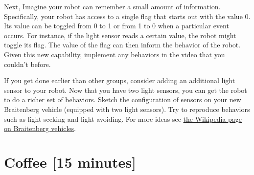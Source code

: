 \documentclass{tufte-handout}
\begin{document}
Next, Imagine your robot can remember a small amount of information.   Specifically, your robot has access to a single flag that starts out with the value 0.  Its value can be toggled from 0 to 1 or from 1 to 0 when a particular event occurs.  For instance, if the light sensor reads a certain value, the robot might toggle its flag.  The value of the flag can then inform the behavior of the robot. Given this new capability, implement any behaviors in the video that you couldn't before.

If you get done earlier than other groups, consider adding an additional light sensor to your robot.  Now that you have two light sensors, you can get the robot to do a richer set of behaviors.  Sketch the configuration of sensors on your new Braitenberg vehicle (equipped with two light sensors).  Try to reproduce behaviors such as light seeking and light avoiding.  For more ideas see \href{https://en.wikipedia.org/wiki/Braitenberg_vehicle}{the Wikipedia page on Braitenberg vehicles}.


\section{Coffee [15 minutes]}
\end{document}
